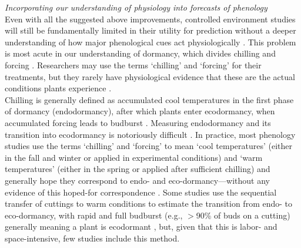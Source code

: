 \documentclass[11pt,letter]{article}
\begin{document}

\emph{Incorporating our understanding of physiology into forecasts of phenology}\\
Even with all the suggested above improvements, controlled environment studies will still be fundamentally limited in their utility for prediction without a deeper understanding of how major phenological cues act physiologically \citep{Bahuguna2015}. This problem is most acute in our understanding of dormancy, which divides chilling and forcing \citep{chang2021}. Researchers may use the terms `chilling' and `forcing' for their treatments, but they rarely have physiological evidence that these are the actual conditions plants experience \citep[][]{chuine2016}. \\

Chilling is generally defined as accumulated cool temperatures in the first phase of dormancy (endodormancy), after which plants enter ecodormancy, when accumulated forcing leads to budburst \citep{chuine2016}. Measuring endodormancy and its transition into ecodormancy is notoriously difficult \citep[e.g.,][]{Junttila:2012aa}. In practice, most phenology studies use the terms `chilling' and `forcing' to mean `cool temperatures' (either in the fall and winter or applied in experimental conditions) and `warm temperatures' (either in the spring or applied after sufficient chilling) and generally hope they correspond to endo- and eco-dormancy---without any evidence of this hoped-for correspondence \citep{ettinger2020}. Some studies use the sequential transfer of cuttings to warm conditions to estimate the transition from endo- to eco-dormancy, with rapid and full budburst (e.g., $>$90\% of buds on a cutting) generally meaning a plant is ecodormant \citep[e.g.,][]{Junttila:2012aa}, but, given that this is labor- and space-intensive, few studies include this method. \\
\end{document}
